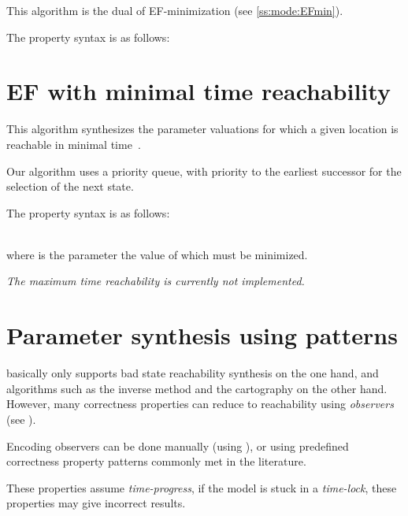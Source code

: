 This algorithm is the dual of EF-minimization (see \cref{ss:mode:EFmin}).

The property syntax is as follows:



\section{EF with minimal time reachability}\label{ss:mode:EFopt}

This algorithm synthesizes the parameter valuations for which a given location is reachable in minimal time~\cite{ABPV19}.

Our algorithm uses a priority queue, with priority to the earliest successor for the selection of the next state.

%

The property syntax is as follows:

\\
where  is the parameter the value of which must be minimized.

\emph{The maximum time reachability is currently not implemented.}


\section{Parameter synthesis using patterns}\label{ss:mode:prop}

\imitator{} basically only supports bad state reachability synthesis on the one hand, and algorithms such as the inverse method and the cartography on the other hand.
However, many correctness properties can reduce to reachability using \emph{observers} (see \cite{ABL98,ABBL98,ABBL03,Andre13ICECCS}).

Encoding observers can be done manually (using \adhoc{} \IPTA{}), or using predefined correctness property patterns commonly met in the literature.

\begin{becareful}
	These properties assume \emph{time-progress}, \ie{} if the model is stuck in a \emph{time-lock}, these properties may give incorrect results.
\end{becareful}


